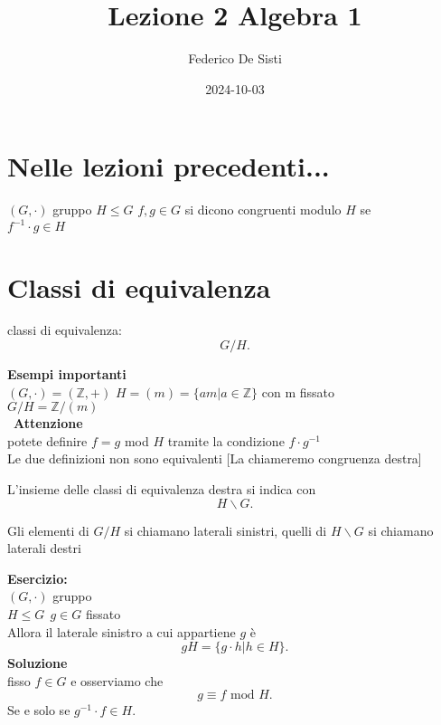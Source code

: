 \documentclass[12px]{article}
\title{Lezione 2 Algebra 1}
\date{2024-10-03}
\author{Federico De Sisti}
\begin{document}
	\maketitle
	\newpage
	\section{Nelle lezioni precedenti...}
	\begin{defi}
		$(G,\cdot)$ gruppo $H\leq G$
	$f,g\in G$ si dicono congruenti modulo $H$ se\\ $f^{-1}\cdot g\in H$
	\end{defi}
	\section{Classi di equivalenza}
	\begin{nota}
		classi di equivalenza:\\
		\[
		G/H
		.\] 
	\end{nota}
	\textbf{Esempi importanti}\\
	$(G,\cdot) = (\mathbb Z, +)$
	$H = (m) = \lbrace a m | a\in \mathbb Z\rbrace$ con m fissato\\
	 $G/H = \mathbb Z/(m)$ \\\
	 \textbf{Attenzione}\\
	 potete definire $f = g$ mod $H$ tramite la condizione  $f\cdot g^{-1}$ \\
	 Le due definizioni non sono equivalenti [La chiameremo congruenza destra]\\
	 \begin{nota}
	L'insieme delle classi di equivalenza destra si indica con
	\[
		H\backslash G
	.\] 
	 \end{nota}
	 \begin{defi}
	 	Gli elementi di $G/H$ si chiamano laterali sinistri, quelli di  $H\backslash G$ si chiamano laterali destri
	 \end{defi}
	 \textbf{Esercizio:}\\
	 $(G,\cdot)$ gruppo\\
	 $H\leq G \ \ g\in G$ fissato\\
	 Allora il laterale sinistro a cui appartiene  $g$ è\\ \[
	 gH = \lbrace g\cdot h | h\in H\rbrace
	 .\] 
	 \textbf{Soluzione}\\
	 fisso $f\in G$ e osserviamo che  \[
		 g\equiv f \text{ mod } H
	 .\] 
	 Se e solo se $g^{-1}\cdot f\in H$.\\
\end{document}
